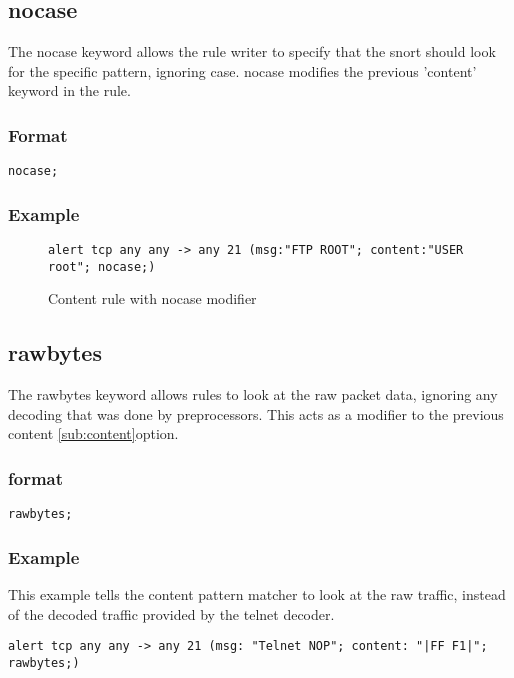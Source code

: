 \documentclass[english]{report}
\begin{document}
\subsection{nocase}

The nocase keyword allows the rule writer to specify that the snort should look
for the specific pattern, ignoring case.  nocase modifies the previous 'content' keyword in the rule.

\subsubsection{Format}

\begin{verbatim}
nocase;
\end{verbatim}

\subsubsection{Example}
\begin{figure}[!hbpt]
\begin{verbatim}
alert tcp any any -> any 21 (msg:"FTP ROOT"; content:"USER root"; nocase;)
\end{verbatim}

\caption{\label{content nocase mod example}Content rule with nocase modifier}
\end{figure}

\subsection{rawbytes \label{sub:rawbytes}}

The rawbytes keyword allows rules to look at the raw packet data, ignoring any
decoding that was done by preprocessors.  This acts as a modifier to the
previous content \ref{sub:content}option. 

\subsubsection{format}

\begin{verbatim}
rawbytes;
\end{verbatim}

\subsubsection{Example}

This example tells the content pattern matcher to look at the raw traffic,
instead of the decoded traffic provided by the telnet decoder.
\begin{verbatim}
alert tcp any any -> any 21 (msg: "Telnet NOP"; content: "|FF F1|"; rawbytes;)
\end{verbatim}
\end{document}
